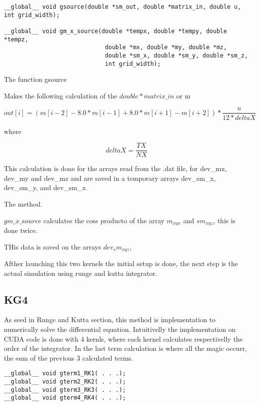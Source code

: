 \begin{lstlisting}[frame=none]
__global__ void gsource(double *sm_out, double *matrix_in, double u, int grid_width);

__global__ void gm_x_source(double *tempx, double *tempy, double *tempz,
							 double *mx, double *my, double *mz,
							 double *sm_x, double *sm_y, double *sm_z,
							 int grid_width);
\end{lstlisting}


The function gsource

Makes the following calculation of the $double *matrix\_in$ or m


\begin{equation} \label{eq:gsource}
out[i] = (m[i-2] - 8.0*m[i-1] + 8.0*m[i+1] - m[i+2]) * \dfrac{u}{12 * deltaX }
\end{equation}

where

$$deltaX = \frac{TX}{NX}$$

This calculation is done for the arrays read from the .dat file, for dev\_mx, dev\_my and dev\_mz and are saved in a temporary arrays dev\_sm\_x, dev\_sm\_y, and dev\_sm\_z.

The method.

$gm\_x\_source$ calculates the coss producto of the array $m_{xyx}$ and $sm_{xyz}$, this is done twice.

THis data is saved on the arrays $dev_sm_{xyz}$,

Afther launching this two kernels the initial setup is done, the next step is the actual simulation using runge and kutta integrator.


\subsection{KG4}

As seed  in Runge and Kutta section, this method is implementation to numerically solve the differential equation. Intuitivelly the implementation on CUDA code is done with 4 kernls, where each kernel calculates respectivelly the order of the integrator. In the last term calculation is where all the magic occurr, the sum of the previous 3 calculated terms.

\begin{lstlisting}[frame=none]
__global__ void gterm1_RK1( . . .);
__global__ void gterm2_RK2( . . .);
__global__ void gterm3_RK3( . . .);
__global__ void gterm4_RK4( . . .);
\end{lstlisting}

